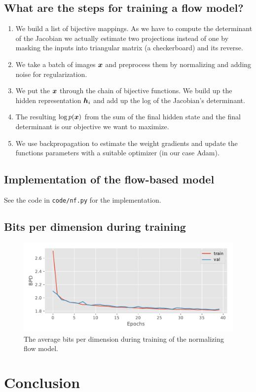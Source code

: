 \documentclass{article}
\begin{document}
\subsection{What are the steps for training a flow model?}
\begin{enumerate}
  \item We build a list of bijective mappings.
  As we have to compute the determinant of the Jacobian we actually estimate two projections instead of one by masking the inputs into triangular matrix (a checkerboard) and its reverse.
  \item We take a batch of images \(\B{x}\) and preprocess them by normalizing and adding noise for regularization.
  \item We put the \(\B{x}\) through the chain of bijective functions.
  We build up the hidden representation \(\B{h}_i\) and add up the log of the Jacobian's determinant.
  \item The resulting \(\log p(\B{x})\) from the sum of the final hidden state and the final determinant is our objective we want to maximize.
  \item We use backpropagation to estimate the weight gradients and update the functions parameters with a suitable optimizer (in our case Adam).
\end{enumerate}

\subsection{Implementation of the flow-based model}
See the code in \texttt{code/nf.py} for the implementation.

\subsection{Bits per dimension during training}
\begin{figure}
  \centering
  \includegraphics[width=0.7\linewidth]{assignment_3/code/figures/nf.pdf}
  \caption{The average bits per dimension during training of the normalizing flow model.}
  \label{fig:nf}
\end{figure}

\section{Conclusion}



\end{document}
